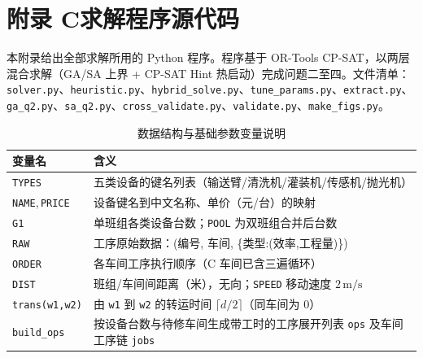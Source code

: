 \documentclass[12pt,a4paper]{ctexart}
\begin{document}
\section{附录 C\quad 求解程序源代码}\label{app:code}

本附录给出全部求解所用的 Python 程序。程序基于 OR-Tools CP-SAT，以两层混合求解（GA/SA 上界 + CP-SAT Hint 热启动）完成问题二至四。文件清单：\texttt{solver.py}、\texttt{heuristic.py}、\texttt{hybrid\_solve.py}、\texttt{tune\_params.py}、\texttt{extract.py}、\texttt{ga\_q2.py}、\texttt{sa\_q2.py}、\texttt{cross\_validate.py}、\texttt{validate.py}、\texttt{make\_figs.py}。

\begin{table}[H]
\centering
\caption{数据结构与基础参数变量说明}\label{tab:var-data}
\begin{tabular}{p{3.0cm} p{11.5cm}}
\toprule
\textbf{变量名} & \textbf{含义} \\
\midrule
\texttt{TYPES} & 五类设备的键名列表（输送臂/清洗机/灌装机/传感机/抛光机） \\
\texttt{NAME},\,\texttt{PRICE} & 设备键名到中文名称、单价（元/台）的映射 \\
\texttt{G1} & 单班组各类设备台数；\texttt{POOL} 为双班组合并后台数 \\
\texttt{RAW} & 工序原始数据：(编号, 车间, \{类型:(效率,工程量)\}) \\
\texttt{ORDER} & 各车间工序执行顺序（C 车间已含三遍循环） \\
\texttt{DIST} & 班组/车间间距离（米），无向；\texttt{SPEED} 移动速度 $2\,\mathrm{m/s}$ \\
\texttt{trans(w1,w2)} & 由 \texttt{w1} 到 \texttt{w2} 的转运时间 $\lceil d/2\rceil$（同车间为 0） \\
\texttt{build\_ops} & 按设备台数与待修车间生成带工时的工序展开列表 \texttt{ops} 及车间工序链 \texttt{jobs} \\
\bottomrule
\end{tabular}
\end{table}
\end{document}
